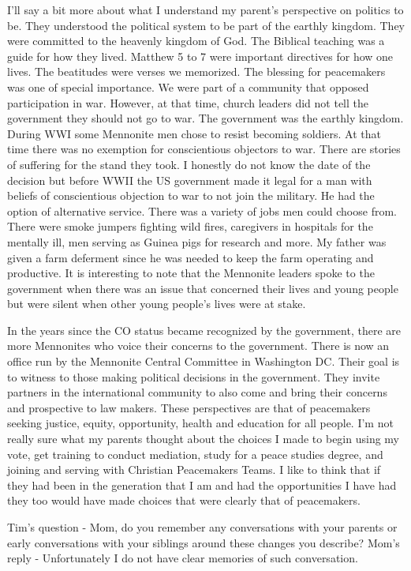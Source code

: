 I'll say a bit more about what I understand my parent's perspective on politics to be.
They understood the political system to be part of the earthly kingdom.
They were committed to the heavenly kingdom of God.
The Biblical teaching was a guide for how they lived.
Matthew 5 to 7 were important directives for how one lives.
The beatitudes were verses we memorized.
The blessing for peacemakers was one of special importance.
We were part of a community that opposed participation in war.
However, at that time, church leaders did not tell the government they should not go to war.
The government was the earthly kingdom.
During WWI some Mennonite men chose to resist becoming soldiers.
At that time there was no exemption for conscientious objectors to war.
There are stories of suffering for the stand they took.
I honestly do not know the date of the decision but before WWII the US government made it legal for a man with beliefs of conscientious objection to war to not join the military.
He had the option of alternative service.
There was a variety of jobs men could choose from.
There were smoke jumpers fighting wild fires, caregivers in hospitals for the mentally ill, men serving as Guinea pigs for research and more.
My father was given a farm deferment since he was needed to keep the farm operating and productive.
It is interesting to note that the Mennonite leaders spoke to the government when there was an issue that concerned their lives and young people but were silent when other young people's lives were at stake.

In the years since the CO status became recognized by the government, there are more Mennonites who voice their concerns to the government.
There is now an office run by the Mennonite Central Committee in Washington DC.
Their goal is to witness to those making political decisions in the government.
They invite partners in the international community to also come and bring their concerns and prospective to law makers.
These perspectives are that of peacemakers seeking justice, equity, opportunity, health and education for all people.
I'm not really sure what my parents thought about the choices I made to begin using my vote, get training to conduct mediation, study for a peace studies degree, and joining and serving with Christian Peacemakers Teams.
I like to think that if they had been in the generation that I am and had the opportunities I have had they too would have made choices that were clearly that of peacemakers.

Tim's question - Mom, do you remember any conversations with your parents or early conversations with your siblings around these changes you describe?
Mom's reply - Unfortunately I do not have clear memories of such conversation.
